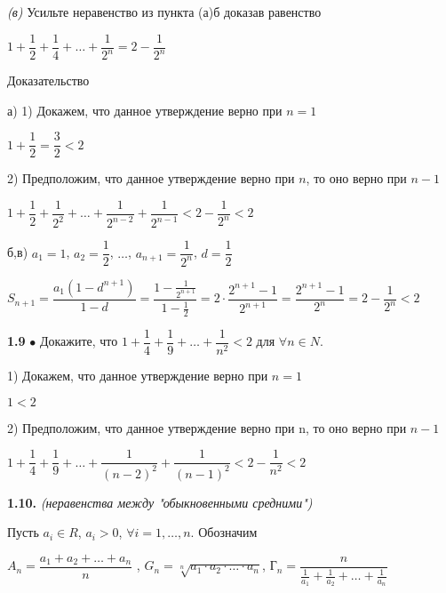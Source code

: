 \documentclass[12pt]{article}
\begin{document}
	{\it (в)} Усильте неравенство из пункта (а)б доказав равенство
	
	\begin{center}
		$
			1+\dfrac{1}{2}+\dfrac{1}{4}+\dots+\dfrac{1}{2^n} = 2-\dfrac{1}{2^n}
		$
	\end{center}

	Доказательство
	
	а)
	1) Докажем, что данное утверждение верно при $n=1$\vspace{2mm}
	
	
	\qquad$
	 1+\dfrac{1}{2} = \dfrac{3}{2}<2
	$\vspace{2mm}
	
	2) Предположим, что данное утверждение верно при $n$, то оно верно при $n-1$\vspace{2mm}
	
	\qquad
	$
	1+\dfrac{1}{2}+\dfrac{1}{2^2}+\dots+\dfrac{1}{2^{n-2}}+\dfrac{1}{2^{n-1}} < 2- \dfrac{1}{2^n} < 2
	$\medskip
	
	{}\medskip
	
	
	б,в)
	\qquad$a_1 = 1$, $a_2 = \dfrac{1}{2}$, $\dots$, $a_{n+1} = \dfrac{1}{2^n} $, $d = \dfrac{1}{2}$
	\medskip
	
	$	S_{n+1} = \dfrac{a_1(1-d^{n+1})}{1-d} = \dfrac{1- \frac{1}{2^{n+1}}}{1-\frac{1}{2}} = 2\cdot\dfrac{2^{n+1}-1}{2^{n+1}} = \dfrac{2^{n+1}-1}{2^n} = 2 - \dfrac{1}{2^n} <2$
	
	\vspace{2mm}{\it Доказано}
	
	\medskip
	{\bf 1.9} $\bullet$ Докажите, что $1+\dfrac{1}{4}+\dfrac{1}{9} +\dots+\dfrac{1}{n^2}<2$ для $\forall n\in N$.
	\medskip
	
	1) Докажем, что данное утверждение верно при $n=1$
	
	\quad$
		1<2
	$\vspace{2mm}
	
	2) Предположим, что данное утверждение верно при n, то оно верно при $n-1$\vspace{2mm}
	
	\hspace{5mm}$
		1+\dfrac{1}{4}+\dfrac{1}{9}+\dots+\dfrac{1}{(n-2)^2}+\dfrac{1}{(n-1)^2} < 2-\dfrac{1}{n^2} <2
	$
	
	\medskip
	{\bf 1.10.} {\it(неравенства между "обыкновенными средними")}\medskip
	
	Пусть $a_i \in R$, $a_i>0$, $\forall i=1,\dots,n$. Обозначим
	\medskip
	
	\quad$A_n =\dfrac{a_1+a_2+\dots+a_n}{n}$ , \quad $G_n = \sqrt[n]{a_1\cdot a_2\cdot\dots\cdot a_n}$, \quad $\text{Г}_n=\dfrac{n}{\frac{1}{a_1}+\frac{1}{a_2}+\dots+\frac{1}{a_n}}$
	
\end{document}
